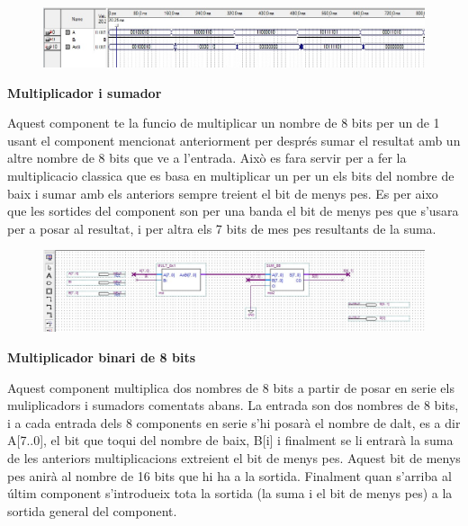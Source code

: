 \documentclass[12pt, a4papre]{article}
\begin{document}
	\begin{center}
	
	\begin{figure}[H]
		\begin{center}
		\includegraphics[width=150mm]{MULT8x1simul.jpeg}
		\end{center}
	\end{figure}
	
	\end{center}
	
	\textbf{\large{Multiplicador i sumador}}
	
	Aquest component te la funcio de multiplicar un nombre de 8 bits per un de 1 usant el component mencionat anteriorment per després sumar el resultat amb un altre nombre de 8 bits que ve a l'entrada. Això es fara servir per a fer la multiplicacio classica que es basa en multiplicar un per un els bits del nombre de baix i sumar amb els anteriors sempre treient el bit de menys pes. Es per aixo que les sortides del component son per una banda el bit de menys pes que s'usara per a posar al resultat, i per altra els 7 bits de mes pes resultants de la suma. 
	
	\begin{center}
	\begin{figure}[H]
		\begin{center}
		\includegraphics[width=150mm]{MULT_+SUM.jpeg}
		\end{center}
	\end{figure}
	
	\end{center}
	
	
	\textbf{\large{Multiplicador binari de 8 bits}}
	
	Aquest component multiplica dos nombres de 8 bits a partir de posar en serie els muliplicadors i sumadors comentats abans. La entrada son dos nombres de 8 bits, i a cada entrada dels 8 components en serie s'hi posarà el nombre de dalt, es a dir A[7..0], el bit que toqui del nombre de baix, B[i] i finalment se li entrarà la suma de les anteriors multiplicacions extreient el bit de menys pes. Aquest bit de menys pes anirà al nombre de 16 bits que hi ha a la sortida. Finalment quan s'arriba al últim component s'introdueix tota la sortida (la suma i el bit de menys pes) a la sortida general del component.
	
\end{document}
